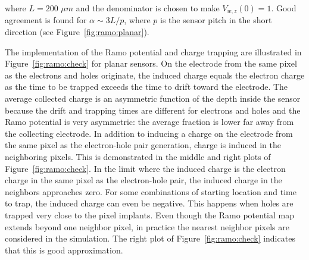 where $L=200$ $\mu m$ and the denominator is chosen to make $V_{w,z}(0)=1$.  Good agreement is found for $\alpha\sim 3L/p$, where $p$ is the sensor pitch in the short direction (see Figure~\ref{fig:ramo:planar}). 


The implementation of the Ramo potential and charge trapping are illustrated in Figure~\ref{fig:ramo:check} for planar sensors.  On the electrode from the same pixel as the electrons and holes originate, the induced charge equals the electron charge as the time to be trapped exceeds the time to drift toward the electrode.   The average collected charge is an asymmetric function of the depth inside the sensor because the drift and trapping times are different for electrons and holes and the Ramo potential is very asymmetric: the average fraction is lower far away from the collecting electrode.  In addition to inducing a charge on the electrode from the same pixel as the electron-hole pair generation, charge is induced in the neighboring pixels.  This is demonstrated in the middle and right plots of Figure~\ref{fig:ramo:check}.  In the limit where the induced charge is the electron charge in the same pixel as the electron-hole pair, the induced charge in the neighbors approaches zero.  For some combinations of starting location and time to trap, the induced charge can even be negative.  This happens when holes are trapped very close to the pixel implants.  Even though the Ramo potential map extends beyond one neighbor pixel, in practice the nearest neighbor pixels are considered in the simulation.  The right plot of Figure~\ref{fig:ramo:check} indicates that this is good approximation.

